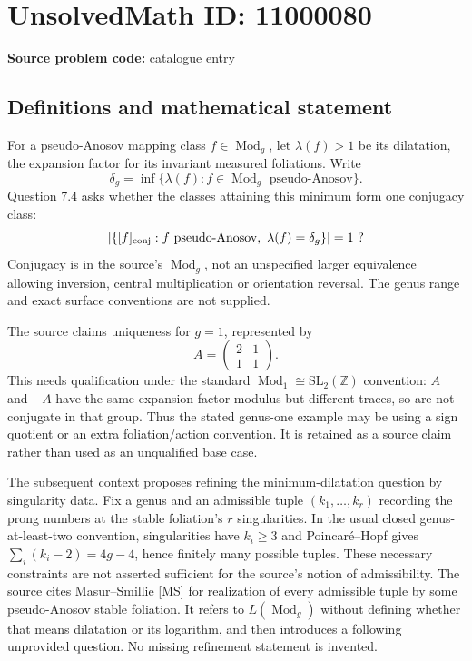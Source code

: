 \documentclass[11pt]{article}
\newcommand{\Z}{\mathbb{Z}}
\begin{document}
\section*{UnsolvedMath ID: 11000080}
\textbf{Source problem code:} catalogue entry
\subsection{Definitions and mathematical statement}
For a pseudo-Anosov mapping class \(f\in\operatorname{Mod}_g\), let \(\lambda(f)>1\) be its dilatation, the expansion factor for its invariant measured foliations. Write
\[
 \delta_g=\inf\{\lambda(f):f\in\operatorname{Mod}_g
                         \text{ pseudo-Anosov}\}.
\]
Question 7.4 asks whether the classes attaining this minimum form one conjugacy class:
\[
 \left|\{[f]_{\rm conj}: f\text{ pseudo-Anosov},\ \lambda(f)=\delta_g\}\right|=1\ ?
\]
Conjugacy is in the source's \(\operatorname{Mod}_g\), not an unspecified larger equivalence allowing inversion, central multiplication or orientation reversal. The genus range and exact surface conventions are not supplied.

The source claims uniqueness for \(g=1\), represented by
\[
 A=\begin{pmatrix}2&1\\1&1\end{pmatrix}.
\]
This needs qualification under the standard \(\operatorname{Mod}_1\cong\mathrm{SL}_2(\Z)\) convention: \(A\) and \(-A\) have the same expansion-factor modulus but different traces, so are not conjugate in that group. Thus the stated genus-one example may be using a sign quotient or an extra foliation/action convention. It is retained as a source claim rather than used as an unqualified base case.

The subsequent context proposes refining the minimum-dilatation question by singularity data. Fix a genus and an admissible tuple \((k_1,\ldots,k_r)\) recording the prong numbers at the stable foliation's \(r\) singularities. In the usual closed genus-at-least-two convention, singularities have \(k_i\ge3\) and Poincaré--Hopf gives \(\sum_i(k_i-2)=4g-4\), hence finitely many possible tuples. These necessary constraints are not asserted sufficient for the source's notion of admissibility. The source cites Masur--Smillie [MS] for realization of every admissible tuple by some pseudo-Anosov stable foliation. It refers to \(L(\operatorname{Mod}_g)\) without defining whether that means dilatation or its logarithm, and then introduces a following unprovided question. No missing refinement statement is invented.
\end{document}
